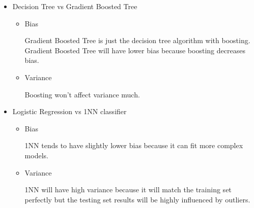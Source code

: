 \documentclass{article}
\begin{document}
\begin{enumerate}
\begin{itemize}
\begin{itemize}
                            Random forest is just the decision tree algorithm with bagging. Bias should be similar across both because bagging doesn't affect bias much.
                        \item Variance
                        
                            Random forest will have lower variance because bagging lowers variance.
                    \end{itemize}
                
                \item Decision Tree vs Gradient Boosted Tree
                    \begin{itemize}
                        \item Bias
                        
                            Gradient Boosted Tree is just the decision tree algorithm with boosting. Gradient Boosted Tree will have lower bias because boosting decreases bias.
                        \item Variance
                        
                            Boosting won't affect variance much.
                    \end{itemize}

                \item Logistic Regression vs 1NN classifier
                    \begin{itemize}
                        \item Bias
                        
                            1NN tends to have slightly lower bias because it can fit more complex models.
                        \item Variance
                        
                            1NN will have high variance because it will match the training set perfectly but the testing set results will be highly influenced by outliers.
                    \end{itemize}
            \end{itemize}
            

\end{enumerate}
\end{document}
